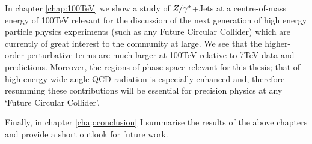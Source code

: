 	In chapter \ref{chap:100TeV} we show a study of $Z/\gamma^*$+Jets at a centre-of-mass energy of 100TeV relevant for the
	discussion of the next generation of high energy particle physics experiments (such as any Future Circular Collider)
	which are currently of great interest to the community at large.  We see that the higher-order perturbative terms are
	much larger at 100TeV relative to 7TeV data and predictions.  Moreover, the regions of phase-space relevant
	for this thesis; that of high energy wide-angle QCD radiation is especially enhanced and, therefore resumming
	these contributions will be essential for precision physics at any `Future Circular Collider'.

	Finally, in chapter \ref{chap:conclusion} I summarise the results of the above chapters and provide a short
	outlook for future work.

